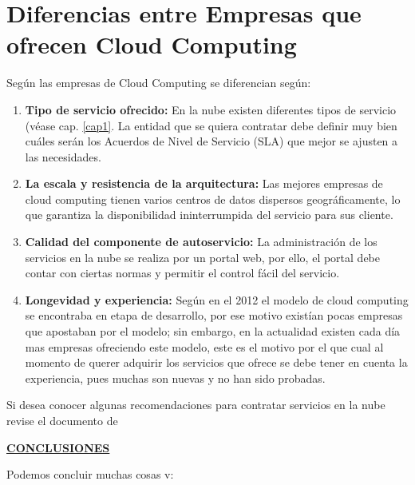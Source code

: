 \documentclass[a4paper, 12pt]{report}
\begin{document}
\section{Diferencias entre Empresas que ofrecen Cloud Computing}
	\begin{justify}
	Seg\'un \cite{Akami} las empresas de Cloud Computing se diferencian seg\'un:
	\begin{enumerate}[label=\alph*)]
		\item \textbf{Tipo de servicio ofrecido: } En la nube existen diferentes tipos de servicio (v\'ease cap. \ref{cap1}. La entidad que se quiera contratar debe definir muy bien cu\'ales ser\'an los Acuerdos de Nivel de Servicio (SLA) que mejor se ajusten a las necesidades.
		\item \textbf{La escala y resistencia de la arquitectura:} Las mejores empresas de cloud computing tienen varios centros de datos dispersos geográficamente, lo que garantiza la disponibilidad ininterrumpida del servicio para sus cliente.
		\item \textbf{Calidad del componente de autoservicio:} La administraci\'on  de los servicios en la nube se realiza por un portal web, por ello, el portal debe contar con ciertas normas y permitir el control f\'acil del servicio.
		\item \textbf{Longevidad y experiencia:} Seg\'un \cite{CristianCA} en el 2012  el modelo de cloud computing se encontraba en etapa de desarrollo, por ese motivo existían pocas empresas que apostaban por el modelo; sin embargo,  en la actualidad existen cada día mas empresas ofreciendo este modelo, este es el motivo por el que cual al momento de querer adquirir los servicios que ofrece se debe tener en cuenta la experiencia, pues muchas son nuevas y no han sido probadas.
	\end{enumerate}
	Si desea conocer algunas recomendaciones para contratar servicios en la nube revise el documento de \cite{Beimar}
\end{justify}




\newpage
\vspace*{6em}
\begin{center}
{\bf{\large{\underline{CONCLUSIONES}}}}
\end{center}
\begin{justify}
Podemos concluir muchas cosas v:
\end{justify}



\vspace*{6em}
 
\end{document}
